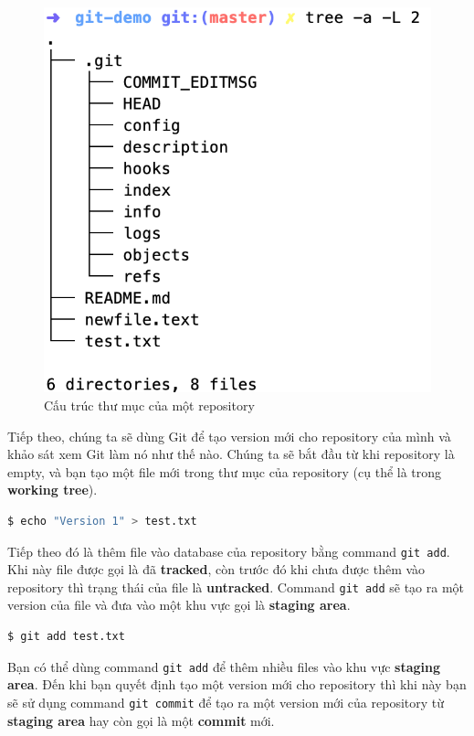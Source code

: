 \documentclass[a4paper, 11pt]{article}
\begin{document}
\begin{figure}
\centering
\includegraphics[scale=0.5]{repository-directory.png}
\caption{Cấu trúc thư mục của một repository}
\label{fig:repository-directory-structure}
\end{figure}

Tiếp theo, chúng ta sẽ dùng Git để tạo version mới cho repository của mình và khảo sát xem Git làm nó như thế nào. Chúng ta sẽ bắt đầu từ khi repository là empty, và bạn tạo một file mới trong thư mục của repository (cụ thể là trong \textbf{working tree}).

\begin{lstlisting}[language=bash]
$ echo "Version 1" > test.txt
\end{lstlisting}

Tiếp theo đó là thêm file vào database của repository bằng command \texttt{git add}. Khi này file được gọi là đã \textbf{tracked}, còn trước đó khi chưa được thêm vào repository thì trạng thái của file là \textbf{untracked}. Command \texttt{git add} sẽ tạo ra một version của file và đưa vào một khu vực gọi là \textbf{staging area}.

\begin{lstlisting}[language=bash]
$ git add test.txt
\end{lstlisting}

Bạn có thể dùng command \texttt{git add} để thêm nhiều files vào khu vực \textbf{staging area}. Đến khi bạn quyết định tạo một version mới cho repository thì khi này bạn sẽ sử dụng command \texttt{git commit} để tạo ra một version mới của repository từ \textbf{staging area} hay còn gọi là một \textbf{commit} mới.
\end{document}
